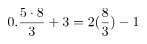 \documentclass[preview]{standalone}
\begin{document}
\begin{align*}
\special{dvisvgm:raw <g id='unique000'>}0.\frac{5 \cdot 8}{3}+3 = 2(\frac{8}{3})-1\special{dvisvgm:raw </g>}
\end{align*}
\end{document}
